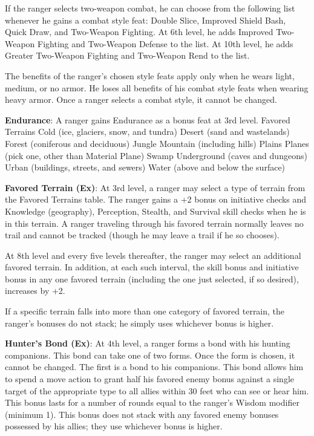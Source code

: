 If the ranger selects two-weapon combat, he can choose from the following list whenever he gains a combat style feat: Double Slice, Improved Shield Bash, Quick Draw, and Two-Weapon Fighting. At 6th level, he adds Improved Two-Weapon Fighting and Two-Weapon Defense to the list. At 10th level, he adds Greater Two-Weapon Fighting and Two-Weapon Rend to the list.
				
The benefits of the ranger's chosen style feats apply only when he wears light, medium, or no armor. He loses all benefits of his combat style feats when wearing heavy armor. Once a ranger selects a combat style, it cannot be changed.
				
\textbf{Endurance}: A ranger gains Endurance as a bonus feat at 3rd level.
Favored Terrains
Cold (ice, glaciers, snow, and tundra)
Desert (sand and wastelands)
Forest (coniferous and deciduous)
Jungle
Mountain (including hills)
Plains
Planes (pick one, other than Material Plane)
Swamp
Underground (caves and dungeons)
Urban (buildings, streets, and sewers)
Water (above and below the surface)

\textbf{Favored Terrain (Ex)}: At 3rd level, a ranger may select a type of terrain from the Favored Terrains table. The ranger gains a +2 bonus on initiative checks and Knowledge (geography), Perception, Stealth, and Survival skill checks when he is in this terrain. A ranger traveling through his favored terrain normally leaves no trail and cannot be tracked (though he may leave a trail if he so chooses).
				
At 8th level and every five levels thereafter, the ranger may select an additional favored terrain. In addition, at each such interval, the skill bonus and initiative bonus in any one favored terrain (including the one just selected, if so desired), increases by +2. 
				
If a specific terrain falls into more than one category of favored terrain, the ranger's bonuses do not stack; he simply uses whichever bonus is higher.
				
\textbf{Hunter's Bond (Ex)}: At 4th level, a ranger forms a bond with his hunting companions. This bond can take one of two forms. Once the form is chosen, it cannot be changed. The first is a bond to his companions. This bond allows him to spend a move action to grant half his favored enemy bonus against a single target of the appropriate type to all allies within 30 feet who can see or hear him. This bonus lasts for a number of rounds equal to the ranger's Wisdom modifier (minimum 1). This bonus does not stack with any favored enemy bonuses possessed by his allies; they use whichever bonus is higher.
				
